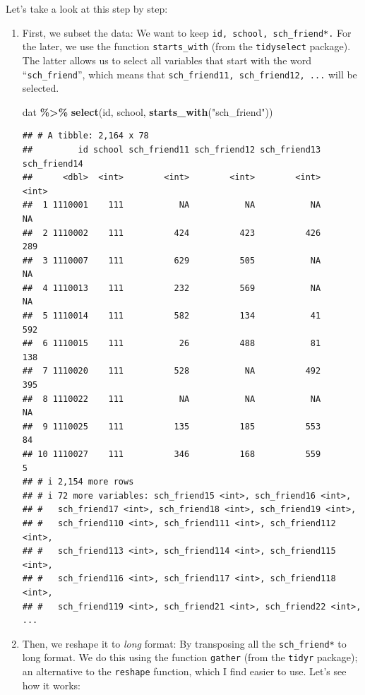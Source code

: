 \documentclass[
]{book}
\newenvironment{Shaded}{\begin{snugshade}}{\end{snugshade}}
\newcommand{\FunctionTok}[1]{\textcolor[rgb]{0.13,0.29,0.53}{\textbf{#1}}}
\newcommand{\NormalTok}[1]{#1}
\newcommand{\SpecialCharTok}[1]{\textcolor[rgb]{0.81,0.36,0.00}{\textbf{#1}}}
\newcommand{\StringTok}[1]{\textcolor[rgb]{0.31,0.60,0.02}{#1}}
\begin{document}
Let's take a look at this step by step:

\begin{enumerate}
\def\labelenumi{\arabic{enumi}.}
\item
  First, we subset the data: We want to keep \texttt{id,\ school,\ sch\_friend*.} For the later, we use the function \texttt{starts\_with} (from the \texttt{tidyselect} package). The latter allows us to select all variables that start with the word ``\texttt{sch\_friend}'', which means that \texttt{sch\_friend11,\ sch\_friend12,\ ...} will be selected.

\begin{Shaded}
\begin{Highlighting}[]
\NormalTok{dat }\SpecialCharTok{\%\textgreater{}\%} 
  \FunctionTok{select}\NormalTok{(id, school, }\FunctionTok{starts\_with}\NormalTok{(}\StringTok{"sch\_friend"}\NormalTok{))}
\end{Highlighting}
\end{Shaded}

\begin{verbatim}
## # A tibble: 2,164 x 78
##         id school sch_friend11 sch_friend12 sch_friend13 sch_friend14
##      <dbl>  <int>        <int>        <int>        <int>        <int>
##  1 1110001    111           NA           NA           NA           NA
##  2 1110002    111          424          423          426          289
##  3 1110007    111          629          505           NA           NA
##  4 1110013    111          232          569           NA           NA
##  5 1110014    111          582          134           41          592
##  6 1110015    111           26          488           81          138
##  7 1110020    111          528           NA          492          395
##  8 1110022    111           NA           NA           NA           NA
##  9 1110025    111          135          185          553           84
## 10 1110027    111          346          168          559            5
## # i 2,154 more rows
## # i 72 more variables: sch_friend15 <int>, sch_friend16 <int>,
## #   sch_friend17 <int>, sch_friend18 <int>, sch_friend19 <int>,
## #   sch_friend110 <int>, sch_friend111 <int>, sch_friend112 <int>,
## #   sch_friend113 <int>, sch_friend114 <int>, sch_friend115 <int>,
## #   sch_friend116 <int>, sch_friend117 <int>, sch_friend118 <int>,
## #   sch_friend119 <int>, sch_friend21 <int>, sch_friend22 <int>, ...
\end{verbatim}
\item
  Then, we reshape it to \emph{long} format: By transposing all the \texttt{sch\_friend*} to long format. We do this using the function \texttt{gather} (from the \texttt{tidyr} package); an alternative to the \texttt{reshape} function, which I find easier to use. Let's see how it works:


\end{enumerate}
\end{document}
